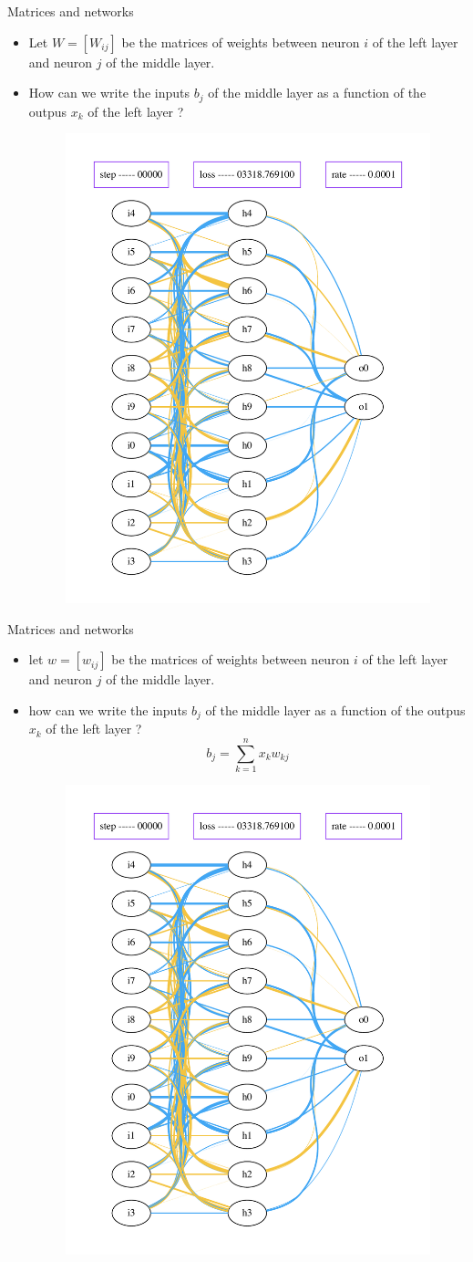 \documentclass{beamer}
\begin{document}
\begin{frame}{Matrices and networks}
    \begin{itemize}
        \item Let $W=[W_{ij}]$ be the matrices of weights between neuron $i$ of
            the left layer and neuron $j$ of the middle layer.
        \item How can we write the inputs $b_j$ of the middle layer as a
            function of the outpus $x_k$ of the left layer ?
            \begin{figure}[htpb]
                \centering
                \includegraphics[width=0.4\linewidth]{net_0}
                \label{fig:name}
            \end{figure}
    \end{itemize}
\end{frame}

\begin{frame}{Matrices and networks}
    \begin{itemize}
        \item let $w=[w_{ij}]$ be the matrices of weights between neuron $i$ of
            the left layer and neuron $j$ of the middle layer.
        \item how can we write the inputs $b_j$ of the middle layer as a
            function of the outpus $x_k$ of the left layer ?
            \begin{equation}
                b_j= \sum^{n}_{k=1}x_kw_{kj} 
            \end{equation}
            \begin{figure}[htpb]
                \centering
                \includegraphics[width=0.3\linewidth]{net_0}
                \label{fig:name}
            \end{figure}
    \end{itemize}
\end{frame}
\end{document}
